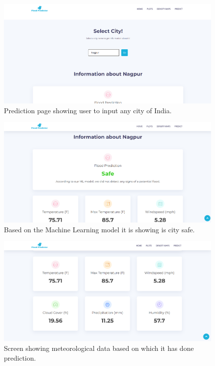 \documentclass[a4paper,12pt]{report}
\begin{document}
\begin{figure}[ht]
  \centering
  \includegraphics[width=\linewidth]{CityName.png}
  \caption{Prediction page showing user to input any city of India.}
\end{figure}

\begin{figure}[ht]
  \centering
  \includegraphics[width=\linewidth]{Predict.png}
  \caption{Based on the Machine Learning model it is showing is city safe.}
\end{figure}

\begin{figure}[ht]
  \centering
  \includegraphics[width=\linewidth]{features.png}
  \caption{Screen showing meteorological data based on which it has done prediction.}
\end{figure}
\end{document}
